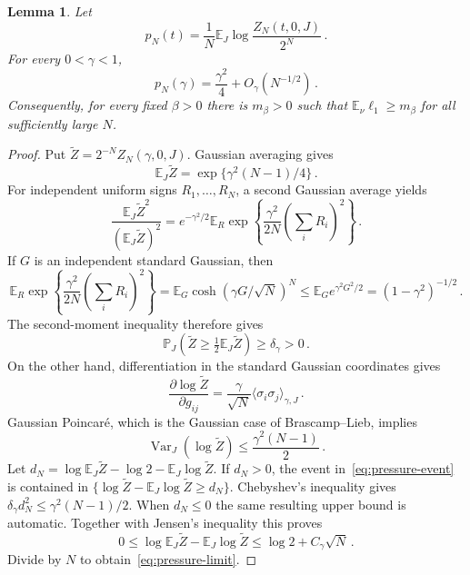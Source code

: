 \documentclass[11pt]{amsart}
\numberwithin{equation}{section}
\newtheorem{lemma}[theorem]{Lemma}
\theoremstyle{remark}
\newcommand{\E}{\mathbb E}
\newcommand{\Pp}{\mathbb P}
\newcommand{\Var}{\operatorname{Var}}
\begin{document}
\begin{lemma}\label{lem:pressure}
Let
\begin{equation}
 p_N(t)=\frac1N\E_J\log\frac{Z_N(t,0,J)}{2^N}\,.
 \label{eq:pressure-definition}
\end{equation}
For every $0<\gamma<1$,
\begin{equation}
 p_N(\gamma)=\frac{\gamma^2}{4}+O_\gamma(N^{-1/2})\,.
 \label{eq:pressure-limit}
\end{equation}
Consequently, for every fixed $\beta>0$ there is $m_\beta>0$ such that $\E_\nu\ell_1\ge m_\beta$ for all sufficiently large $N$.
\end{lemma}
\begin{proof}
Put $\widetilde Z=2^{-N}Z_N(\gamma,0,J)$. Gaussian averaging gives
\begin{equation*}
 \E_J\widetilde Z=\exp\{\gamma^2(N-1)/4\}\,.
\end{equation*}
For independent uniform signs $R_1,\ldots,R_N$, a second Gaussian average yields
\begin{equation*}
 \frac{\E_J\widetilde Z^2}{(\E_J\widetilde Z)^2}
 =e^{-\gamma^2/2}\E_R
 \exp\left\{\frac{\gamma^2}{2N}\left(\sum_iR_i\right)^2\right\}\,.
\end{equation*}
If $G$ is an independent standard Gaussian, then
\begin{equation*}
 \E_R\exp\left\{\frac{\gamma^2}{2N}\left(\sum_iR_i\right)^2\right\}
 =\E_G\cosh(\gamma G/\sqrt N)^N
 \le\E_Ge^{\gamma^2G^2/2}
 =(1-\gamma^2)^{-1/2}\,.
\end{equation*}
The second-moment inequality therefore gives
\begin{equation}
 \Pp_J\left(\widetilde Z\ge\tfrac12\E_J\widetilde Z\right)
 \ge\delta_\gamma>0\,.
 \label{eq:pressure-event}
\end{equation}
On the other hand, differentiation in the standard Gaussian coordinates gives
\begin{equation*}
 \frac{\partial\log\widetilde Z}{\partial g_{ij}}
 =\frac\gamma{\sqrt N}\langle\sigma_i\sigma_j\rangle_{\gamma,J}\,.
\end{equation*}
Gaussian Poincar\'e, which is the Gaussian case of Brascamp--Lieb, implies
\begin{equation*}
 \Var_J(\log\widetilde Z)\le\frac{\gamma^2(N-1)}2\,.
\end{equation*}
Let $d_N=\log\E_J\widetilde Z-\log2-\E_J\log\widetilde Z$. If $d_N>0$, the event in~\eqref{eq:pressure-event} is contained in $\{\log\widetilde Z-\E_J\log\widetilde Z\ge d_N\}$. Chebyshev's inequality gives $\delta_\gamma d_N^2\le\gamma^2(N-1)/2$. When $d_N\le0$ the same resulting upper bound is automatic. Together with Jensen's inequality this proves
\begin{equation*}
 0\le\log\E_J\widetilde Z-\E_J\log\widetilde Z
 \le\log2+C_\gamma\sqrt N\,.
\end{equation*}
Divide by $N$ to obtain~\eqref{eq:pressure-limit}.


\end{proof}
\end{document}
